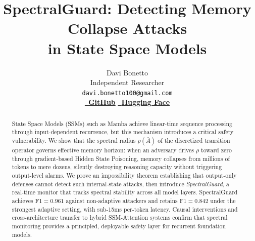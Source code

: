 \documentclass[10pt,twocolumn]{article}
\title{\vspace{-1.5cm}\textbf{\LARGE SpectralGuard: Detecting Memory Collapse Attacks \\[0.3em] in State Space Models}}
\author{
    \Large Davi Bonetto \\[0.5em]
    \large Independent Researcher \\[0.3em]
    \texttt{davi.bonetto100@gmail.com} \\[0.5em]
    \small\href{https://github.com/DaviBonetto/spectralguard}{\githubicon\ \textbf{GitHub}}%
    \hspace{1.5em}%
    \href{https://huggingface.co/DaviBonetto}{\hficon\ \textbf{Hugging Face}}
}
\date{}
\begin{document}


\maketitle

\begin{abstract}
State Space Models (SSMs) such as Mamba achieve linear-time sequence processing through input-dependent recurrence, but this mechanism introduces a critical safety vulnerability. We show that the spectral radius $\rho(\bar{A})$ of the discretized transition operator governs effective memory horizon: when an adversary drives $\rho$ toward zero through gradient-based Hidden State Poisoning, memory collapses from millions of tokens to mere dozens, silently destroying reasoning capacity without triggering output-level alarms. We prove an impossibility theorem establishing that output-only defenses cannot detect such internal-state attacks, then introduce \emph{SpectralGuard}, a real-time monitor that tracks spectral stability across all model layers. SpectralGuard achieves F1$=0.961$ against non-adaptive attackers and retains F1$=0.842$ under the strongest adaptive setting, with sub-15ms per-token latency. Causal interventions and cross-architecture transfer to hybrid SSM-Attention systems confirm that spectral monitoring provides a principled, deployable safety layer for recurrent foundation models.
\end{abstract}

\end{document}
